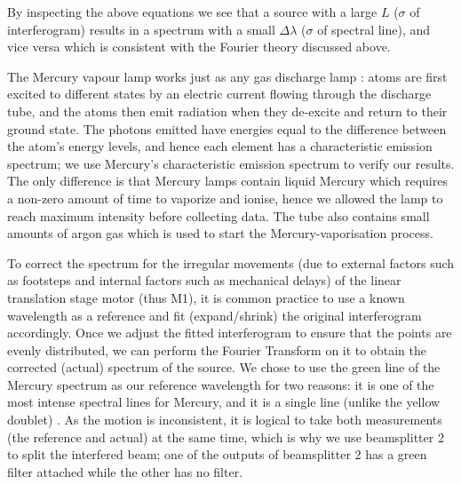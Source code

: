 \documentclass[journal]{Imperial_lab_report}
\begin{document}
By inspecting the above equations we see that a source with a large $L$ ($\sigma$ of interferogram) results in a spectrum with a small $\Delta\lambda$ ($\sigma$ of spectral line), and vice versa which is consistent with the Fourier theory discussed above.



The Mercury vapour lamp works just as any gas discharge lamp \cite{Mercury_lamp_workings}: atoms are first excited to different states by an electric current flowing through the discharge tube, and the atoms then emit radiation when they de-excite and return to their ground state. The photons emitted have energies equal to the difference between the atom's energy levels, and hence each element has a characteristic emission spectrum; we use Mercury's characteristic emission spectrum \cite{Mercury_spectrum} to verify our results. The only difference is that Mercury lamps contain liquid Mercury which requires a non-zero amount of time to vaporize and ionise, hence we allowed the lamp to reach maximum intensity before collecting data. The tube also contains small amounts of argon gas which is used to start the Mercury-vaporisation process.

To correct the spectrum for the irregular movements (due to external factors such as footsteps and internal factors such as mechanical delays) of the linear translation stage motor (thus M1), it is common practice to use a known wavelength as a reference and fit (expand/shrink) the original interferogram accordingly. Once we adjust the fitted interferogram to ensure that the points are evenly distributed, we can perform the Fourier Transform on it to obtain the corrected (actual) spectrum of the source. We chose to use the green line of the Mercury spectrum as our reference wavelength for two reasons: it is one of the most intense spectral lines for Mercury, and it is a single line (unlike the yellow doublet) \cite{Mercury_spectrum}. As the motion is inconsistent, it is logical to take both measurements (the reference and actual) at the same time, which is why we use beamsplitter 2 to split the interfered beam; one of the outputs of beamsplitter 2 has a green filter attached while the other has no filter. 
\end{document}
